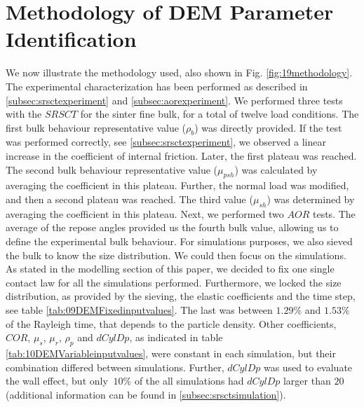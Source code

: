\section{Methodology of DEM Parameter Identification}
\label{sec:methodology}

We now illustrate the methodology used, also shown in Fig.
\ref{fig:19methodology}.
%
The experimental characterization has been performed as described in
\ref{subsec:srsctexperiment} and \ref{subsec:aorexperiment}. We performed
three tests with the $SRSCT$ for the sinter fine bulk, for a total of twelve
load conditions. 
% 
The first bulk behaviour representative value ($\rho_b$) was directly provided. 
If the test was performed correctly, see \ref{subsec:srsctexperiment}, we
observed a linear increase in the coefficient of internal friction.
Later, the first plateau was reached. 
The second bulk behaviour representative value ($\mu_{psh}$) was calculated by averaging the coefficient in this plateau. 
Further, the normal load was modified, and then a second plateau was reached. The third value ($\mu_{sh}$) was 
determined by averaging the coefficient in this plateau. 
Next, we performed two $AOR$ tests. 
The average of the repose angles provided us the fourth bulk value, allowing us
to define the experimental bulk behaviour.
For simulations purposes, we also sieved the bulk to know the size distribution.
We could then focus on the simulations. 
As stated in the modelling section of this paper, we decided to fix one single
contact law for all the simulations performed.
Furthermore, we locked the size distribution, as provided by the sieving, the
elastic coefficients and the time step, see table
\ref{tab:09DEMFixedinputvalues}.
% 
% 
The last was between $1.29 \%$ and $1.53 \%$ of the Rayleigh time, that depends
to the particle density.
Other coefficients, $COR$, $\mu_s$, $\mu_r$,
$\rho_p$ and $dCylDp$, as indicated in table \ref{tab:10DEMVariableinputvalues},
were constant in each simulation, but their combination differed between
simulations.
% 
Further, $dCylDp$ was used to evaluate the wall effect, but only $~10\%$ of the
all simulations had $dCylDp$ larger than $20$ (additional information can be found in \ref{subsec:srsctsimulation}). 
